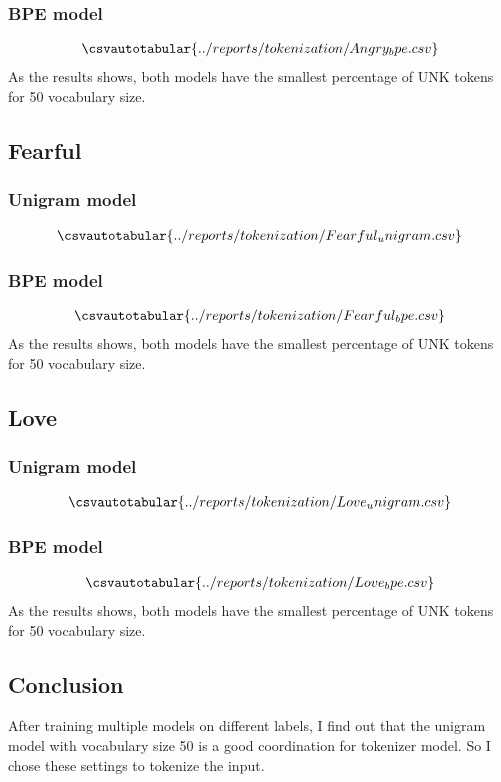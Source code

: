 \documentclass[a4paper]{article}
\begin{document}
\subsubsection{BPE model}
\begin{align*}
	\csvautotabular{../reports/tokenization/Angry_bpe.csv}
\end{align*} 
As the results shows, both models have the smallest percentage of UNK tokens for 50 vocabulary size.

\subsection{Fearful}
\subsubsection{Unigram model}
\begin{align*}
	\csvautotabular{../reports/tokenization/Fearful_unigram.csv}
\end{align*} 
\subsubsection{BPE model}
\begin{align*}
	\csvautotabular{../reports/tokenization/Fearful_bpe.csv}
\end{align*} 
As the results shows, both models have the smallest percentage of UNK tokens for 50 vocabulary size.

\subsection{Love}
\subsubsection{Unigram model}
\begin{align*}
	\csvautotabular{../reports/tokenization/Love_unigram.csv}
\end{align*} 
\subsubsection{BPE model}
\begin{align*}
	\csvautotabular{../reports/tokenization/Love_bpe.csv}
\end{align*} 
As the results shows, both models have the smallest percentage of UNK tokens for 50 vocabulary size.

\subsection{Conclusion}
After training multiple models on different labels, I find out that the unigram model with vocabulary size 50 is a good coordination for tokenizer model. So I chose these settings to tokenize the input.
\bigskip

\end{document}
